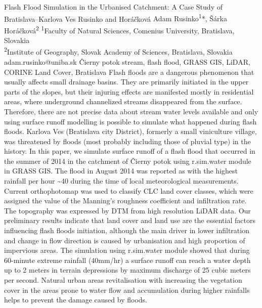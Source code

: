 \abstract
{Flash Flood Simulation in the Urbanised Catchment: A Case Study of Bratislava–Karlova Ves} %
{Rusinko and Horáčková} %
{Adam Rusinko\textsuperscript{1}*, Šárka Horáčková\textsuperscript{2}} %
{\KLtag} %
{
	\textsuperscript{1}Faculty of Natural Sciences, Comenius University, Bratislava, Slovakia\\
	\textsuperscript{2}Institute of Geography, Slovak Academy of Sciences, Bratislava, Slovakia
} %
{adam.rusinko@uniba.sk}  %
{Čierny potok stream, flash flood, GRASS GIS, LiDAR, CORINE Land Cover, Bratislava}%
{Flash floods are a dangerous phenomenon that usually affects small drainage basins. They are primarily initiated in the upper parts of the slopes, but their injuring effects are manifested mostly in residential areas, where underground channelized streams disappeared from the surface. Therefore, there are not precise data about stream water levels available and only using surface runoff modelling is possible to simulate what happened during flash floods. Karlova Ves (Bratislava city District), formerly a small viniculture village, was threatened by floods (most probably including those of pluvial type) in the history. In this paper, we simulate surface runoff of a flash flood that occurred in the summer of 2014 in the catchment of Čierny potok using r.sim.water module in GRASS GIS. The flood in August 2014 was reported as with the highest rainfall per hour \textasciitilde40 during the time of local meteorological measurements. Current orthophotomap was used to classify CLC land cover classes, which were assigned the value of the Manning’s roughness coefficient and infiltration rate. The topography was expressed by DTM from high resolution LiDAR data. Our preliminary results indicate that land cover and land use are the essential factors influencing flash floods initiation, although the main driver in lower infiltration and change in flow direction is caused by urbanisation and high proportion of impervious areas. The simulation using r.sim.water module showed that during 60-minute extreme rainfall (40mm/hr) a surface runoff can reach a water depth up to 2 meters in terrain depressions by maximum discharge of 25 cubic meters per second. Natural urban areas revitalisation with increasing the vegetation cover in the areas prone to water flow and accumulation during higher rainfalls helps to prevent the damage caused by floods.
}%
